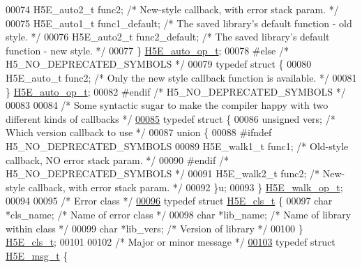 \begin{DoxyCode}
00074     H5E\_auto2\_t func2;      \textcolor{comment}{/* New-style callback, with error stack param. */}
00075     H5E\_auto1\_t func1\_default;      \textcolor{comment}{/* The saved library's default function - old style. */}
00076     H5E\_auto2\_t func2\_default;      \textcolor{comment}{/* The saved library's default function - new style. */}
00077 \} \hyperlink{struct_h5_e__auto__op__t}{H5E\_auto\_op\_t};
00078 \textcolor{preprocessor}{#else }\textcolor{comment}{/* H5\_NO\_DEPRECATED\_SYMBOLS */}\textcolor{preprocessor}{}
00079 \textcolor{keyword}{typedef} \textcolor{keyword}{struct }\{
00080     H5E\_auto\_t  func2;      \textcolor{comment}{/* Only the new style callback function is available. */}
00081 \} \hyperlink{struct_h5_e__auto__op__t}{H5E\_auto\_op\_t};
00082 \textcolor{preprocessor}{#endif }\textcolor{comment}{/* H5\_NO\_DEPRECATED\_SYMBOLS */}\textcolor{preprocessor}{ }
00083 
00084 \textcolor{comment}{/* Some syntactic sugar to make the compiler happy with two different kinds of callbacks */}
\hyperlink{struct_h5_e__walk__op__t}{00085} \textcolor{keyword}{typedef} \textcolor{keyword}{struct }\{
00086     \textcolor{keywordtype}{unsigned} vers;              \textcolor{comment}{/* Which version callback to use */}
00087     \textcolor{keyword}{union }\{
00088 \textcolor{preprocessor}{#ifndef H5\_NO\_DEPRECATED\_SYMBOLS}
00089         H5E\_walk1\_t func1;      \textcolor{comment}{/* Old-style callback, NO error stack param. */}
00090 \textcolor{preprocessor}{#endif }\textcolor{comment}{/* H5\_NO\_DEPRECATED\_SYMBOLS */}\textcolor{preprocessor}{}
00091         H5E\_walk2\_t func2;      \textcolor{comment}{/* New-style callback, with error stack param. */}
00092     \}u;
00093 \} \hyperlink{struct_h5_e__walk__op__t}{H5E\_walk\_op\_t};
00094 
00095 \textcolor{comment}{/* Error class */}
\hyperlink{struct_h5_e__cls__t}{00096} \textcolor{keyword}{typedef} \textcolor{keyword}{struct }\hyperlink{struct_h5_e__cls__t}{H5E\_cls\_t} \{
00097     \textcolor{keywordtype}{char} *cls\_name;             \textcolor{comment}{/* Name of error class */}
00098     \textcolor{keywordtype}{char} *lib\_name;             \textcolor{comment}{/* Name of library within class */}
00099     \textcolor{keywordtype}{char} *lib\_vers;             \textcolor{comment}{/* Version of library */}
00100 \} \hyperlink{struct_h5_e__cls__t}{H5E\_cls\_t};
00101 
00102 \textcolor{comment}{/* Major or minor message */}
\hyperlink{struct_h5_e__msg__t}{00103} \textcolor{keyword}{typedef} \textcolor{keyword}{struct }\hyperlink{struct_h5_e__msg__t}{H5E\_msg\_t} \{

\end{DoxyCode}
